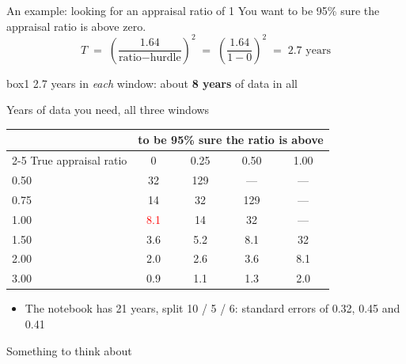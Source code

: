 \documentclass[aspectratio=169,10pt]{beamer}
\begin{document}
\begin{frame}{An example: looking for an appraisal ratio of 1}
You want to be 95\% sure the appraisal ratio is above zero.
\vskip 8pt
\[ T \;=\; \left(\frac{1.64}{\text{ratio} - \text{hurdle}}\right)^{2} \;=\; \left(\frac{1.64}{1 - 0}\right)^{2} \;=\; 2.7 \text{ years} \]
\vskip 8pt
\begin{beamercolorbox}[rounded=true,sep=8pt,center]{box1}
2.7 years in \emph{each} window: about \textbf{8 years} of data in all
\end{beamercolorbox}
\vskip 12pt

\end{frame}

\begin{frame}{Years of data you need, all three windows}
\begin{center}
\renewcommand{\arraystretch}{1.25}
\begin{tabular}{lcccc}
\toprule
 & \multicolumn{4}{c}{to be 95\% sure the ratio is above} \\
\cmidrule(lr){2-5}
True appraisal ratio & 0 & 0.25 & 0.50 & 1.00 \\
\midrule
0.50 & 32 & 129 & --- & --- \\
0.75 & 14 & 32 & 129 & --- \\
1.00 & \textcolor{red}{8.1} & 14 & 32 & --- \\
1.50 & 3.6 & 5.2 & 8.1 & 32 \\
2.00 & 2.0 & 2.6 & 3.6 & 8.1 \\
3.00 & 0.9 & 1.1 & 1.3 & 2.0 \\
\bottomrule
\end{tabular}
\end{center}
\vskip 4pt
\begin{itemize}
\item The notebook has 21 years, split 10 / 5 / 6: standard errors of 0.32, 0.45 and 0.41
\end{itemize}
\end{frame}

\begin{frame}[label=think]
	\begin{center}
		{\Large Something to think about}
	\end{center}
\end{frame}
\end{document}
